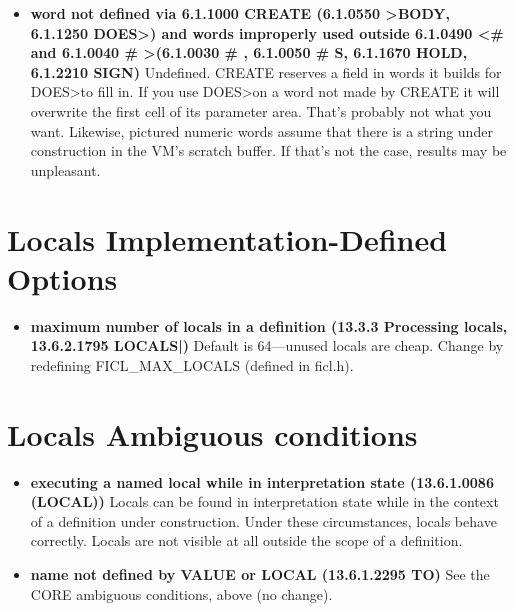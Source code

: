 \begin{itemize}[noitemsep]
	\item \textbf{word not defined via 6.1.1000 CREATE (6.1.0550
		\textgreater BODY, 6.1.1250 DOES\textgreater ) and words
		improperly used outside 6.1.0490 \textless \# and
		6.1.0040 \# \textgreater (6.1.0030 \# , 6.1.0050 \# S,
		6.1.1670 HOLD, 6.1.2210 SIGN)}\newline
	Undefined. CREATE reserves a field in words it builds for
	DOES\textgreater  to fill in. If you use DOES\textgreater  on a
	word not made by CREATE it will overwrite the first cell of its
	parameter area. That's probably not what you want. Likewise,
	pictured numeric words assume that there is a string under
	construction in the VM's scratch buffer. If that's not the
	case, results may be unpleasant.
\end{itemize}


\section{Locals Implementation-Defined Options}
\begin{itemize}[noitemsep]
	\item \textbf{maximum number of locals in a definition (13.3.3
		Processing locals, 13.6.2.1795 LOCALS|)}\newline
	Default is 64—unused locals are cheap. Change by redefining
	FICL\_MAX\_LOCALS (defined in ficl.h).
\end{itemize}


\section{Locals Ambiguous conditions}
\begin{itemize}[noitemsep]
	\item \textbf{executing a named local while in interpretation
		state (13.6.1.0086 (LOCAL))}\newline
	Locals can be found in interpretation state while in the
	context of a definition under construction. Under these
	circumstances, locals behave correctly. Locals are not visible
	at all outside the scope of a definition.

	\item \textbf{name not defined by VALUE or LOCAL (13.6.1.2295
		TO)}\newline
	See the CORE ambiguous conditions, above (no change).
\end{itemize}


